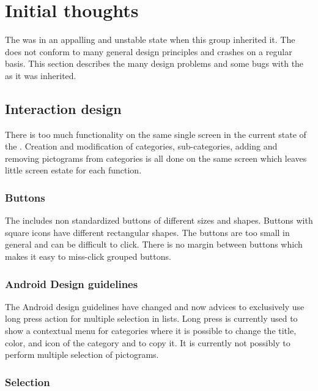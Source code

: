 \section{Initial thoughts}

The \ct was in an appalling and unstable state when this group inherited it. The \ct does not conform to many general design principles and crashes on a regular basis. This section describes the many design problems and some bugs with the \ct as it was inherited.


\subsection{Interaction design}

There is too much functionality on the same single screen in the current state of the \ct. Creation and modification of categories, sub-categories, adding and removing pictograms from categories is all done on the same screen which leaves little screen estate for each function.  

\subsubsection{Buttons}

The \ct includes non standardized buttons of different sizes and shapes. Buttons with square icons have different rectangular shapes. The buttons are too small in general and can be difficult to click. There is no margin between buttons which makes it easy to miss-click grouped buttons.    

\subsubsection{Android Design guidelines}

The Android design guidelines have changed and now advices to exclusively use long press action for multiple selection in lists. Long press is currently used to show a contextual menu for categories where it is possible to change the title, color, and icon of the category and to copy it. It is currently not possibly to perform multiple selection of pictograms. 

\subsubsection{Selection}

